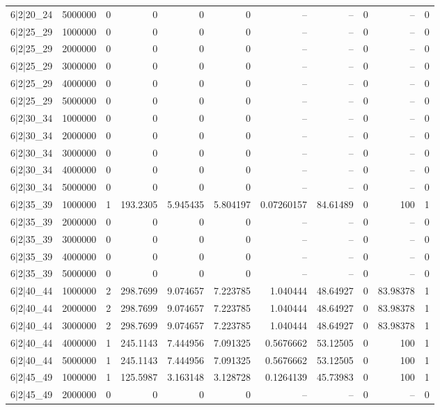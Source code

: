 \begin{tabular}{lrrrrrrrrrr}
6|2|20\_24 & 5000000 & 0 & 0 & 0 & 0 & -- & -- & 0 & -- & 0 \\
6|2|25\_29 & 1000000 & 0 & 0 & 0 & 0 & -- & -- & 0 & -- & 0 \\
6|2|25\_29 & 2000000 & 0 & 0 & 0 & 0 & -- & -- & 0 & -- & 0 \\
6|2|25\_29 & 3000000 & 0 & 0 & 0 & 0 & -- & -- & 0 & -- & 0 \\
6|2|25\_29 & 4000000 & 0 & 0 & 0 & 0 & -- & -- & 0 & -- & 0 \\
6|2|25\_29 & 5000000 & 0 & 0 & 0 & 0 & -- & -- & 0 & -- & 0 \\
6|2|30\_34 & 1000000 & 0 & 0 & 0 & 0 & -- & -- & 0 & -- & 0 \\
6|2|30\_34 & 2000000 & 0 & 0 & 0 & 0 & -- & -- & 0 & -- & 0 \\
6|2|30\_34 & 3000000 & 0 & 0 & 0 & 0 & -- & -- & 0 & -- & 0 \\
6|2|30\_34 & 4000000 & 0 & 0 & 0 & 0 & -- & -- & 0 & -- & 0 \\
6|2|30\_34 & 5000000 & 0 & 0 & 0 & 0 & -- & -- & 0 & -- & 0 \\
6|2|35\_39 & 1000000 & 1 & 193.2305 & 5.945435 & 5.804197 & 0.07260157 & 84.61489 & 0 & 100 & 1 \\
6|2|35\_39 & 2000000 & 0 & 0 & 0 & 0 & -- & -- & 0 & -- & 0 \\
6|2|35\_39 & 3000000 & 0 & 0 & 0 & 0 & -- & -- & 0 & -- & 0 \\
6|2|35\_39 & 4000000 & 0 & 0 & 0 & 0 & -- & -- & 0 & -- & 0 \\
6|2|35\_39 & 5000000 & 0 & 0 & 0 & 0 & -- & -- & 0 & -- & 0 \\
6|2|40\_44 & 1000000 & 2 & 298.7699 & 9.074657 & 7.223785 & 1.040444 & 48.64927 & 0 & 83.98378 & 1 \\
6|2|40\_44 & 2000000 & 2 & 298.7699 & 9.074657 & 7.223785 & 1.040444 & 48.64927 & 0 & 83.98378 & 1 \\
6|2|40\_44 & 3000000 & 2 & 298.7699 & 9.074657 & 7.223785 & 1.040444 & 48.64927 & 0 & 83.98378 & 1 \\
6|2|40\_44 & 4000000 & 1 & 245.1143 & 7.444956 & 7.091325 & 0.5676662 & 53.12505 & 0 & 100 & 1 \\
6|2|40\_44 & 5000000 & 1 & 245.1143 & 7.444956 & 7.091325 & 0.5676662 & 53.12505 & 0 & 100 & 1 \\
6|2|45\_49 & 1000000 & 1 & 125.5987 & 3.163148 & 3.128728 & 0.1264139 & 45.73983 & 0 & 100 & 1 \\
6|2|45\_49 & 2000000 & 0 & 0 & 0 & 0 & -- & -- & 0 & -- & 0 \\

\end{tabular}
